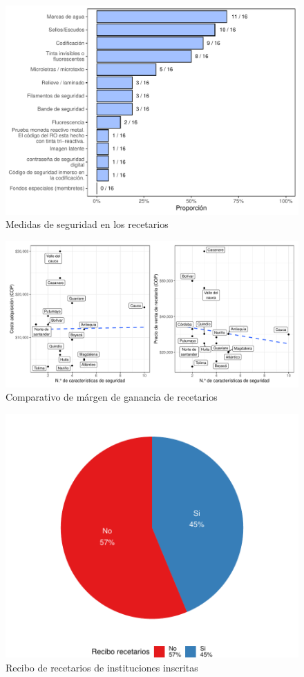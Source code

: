 \documentclass[
]{book}
\begin{document}
\begin{figure}
\includegraphics[width=0.9\linewidth]{InformeFinal_files/figure-latex/MedidasSeguridadRec-1} \caption{Medidas de seguridad en los recetarios}\label{fig:MedidasSeguridadRec}
\end{figure}

\begin{figure}
\includegraphics[width=0.9\linewidth]{InformeFinal_files/figure-latex/ComparativoCostosRec-1} \caption{Comparativo de márgen de ganancia de recetarios}\label{fig:ComparativoCostosRec}
\end{figure}

\begin{figure}
\includegraphics[width=0.85\linewidth]{InformeFinal_files/figure-latex/ReciboRecetariosInstituciones-1} \caption{Recibo de recetarios de instituciones inscritas}\label{fig:ReciboRecetariosInstituciones}
\end{figure}
\end{document}
